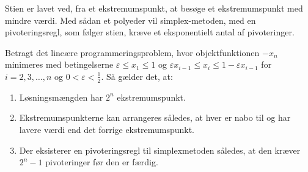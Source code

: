 Stien er lavet ved, fra et ekstremumspunkt, at besøge et ekstremumspunkt med mindre værdi.
Med sådan et polyeder vil simplex-metoden, med en pivoteringsregl, som følger stien, kræve et eksponentielt antal af pivoteringer.
\begin{thm}{}{}
Betragt det lineære programmeringsproblem, hvor objektfunktionen $-x_n$ minimeres med betingelserne $\varepsilon \leq x_1 \leq 1$ og $\varepsilon x_{i-1} \leq x_i \leq 1 - \varepsilon x_{i-1}$ for $i = 2, 3, \ldots, n$ og $0 < \varepsilon < \frac{1}{2}$.
Så gælder det, at:
%
\begin{enumerate}[label=(\alph*)]
\item Løsningsmængden har $2^n$ ekstremumspunkt.
\item Ekstremumspunkterne kan arrangeres således, at hver er nabo til og har lavere værdi end det forrige ekstremumspunkt.
\item Der eksisterer en pivoteringsregl til simplexmetoden således, at den kræver $2^n-1$ pivoteringer før den er færdig.
\end{enumerate}
%
\end{thm}
%
